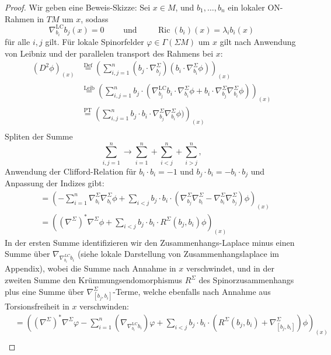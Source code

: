 \documentclass[10pt, letterpaper]{article}
\begin{document}
\begin{proof}
  Wir geben eine Beweis-Skizze: Sei $x \in M$, und $b_1, \ldots, b_n$ ein lokaler ON-Rahmen in $TM$ um $x$, sodass 
  $$\nabla_{b_i}^{\mathrm{LC}} b_j(x)=0\qquad \text{ und }\qquad \operatorname{Ric}\left(b_i\right)(x)=\lambda_i b_i(x)$$
  für alle $i, j$ gilt. Für lokale Spinorfelder $\varphi \in \Gamma(\Sigma M)$ um $x$ gilt nach Anwendung von Leibniz und der parallelen transport des Rahmens bei $x$:
  $$\begin{aligned}
    \left(D^2 \phi\right)_{(x)} 
    & \stackrel{\text{Def}}{=}\left(\sum_{i, j=1}^n \left(b_j \cdot \nabla_{b_j}^{\Sigma}\right)\left( b_i \cdot \nabla_{b_i}^{\Sigma} \phi \right)\right)_{(x)} \\ 
    & \stackrel{\text{Leib}}{=}\left(\sum_{i, j=1}^n b_j \cdot(\nabla_{b_j}^{\mathrm{LC}} b_i \cdot \nabla_{b_i}^{\Sigma} \phi+b_i \cdot \nabla_{b_j}^{\Sigma} \nabla_{b_i}^{\Sigma} \phi)\right)_{(x)} \\ 
    & \stackrel{\text{PT}}{=}\left(\sum_{i, j=1}^n b_j \cdot b_i \cdot \nabla_{b_j}^{\Sigma} \nabla_{b_i}^{\Sigma} \phi)\right)_{(x)} \\ 
  \end{aligned}$$
  Spliten der Summe
  $$\sum_{i,j=1}^n\to \sum_{i=1}^n + \sum_{i<j}^n + \sum_{i>j}^n,$$
  Anwendung der Clifford-Relation für $ b_i \cdot b_i=-1$ und $b_j\cdot b_i=-b_i\cdot b_j$ und Anpassung der Indizes gibt:
  $$\begin{aligned} 
    & = \left(-\sum_{i=1}^n \nabla_{b_i}^{\Sigma} \nabla_{b_i}^{\Sigma} \phi+\sum_{i<j} b_j \cdot b_i \cdot\left(\nabla_{b_j}^{\Sigma} \nabla_{b_i}^{\Sigma}-\nabla_{b_i}^{\Sigma} \nabla_{b_j}^{\Sigma}\right) \phi\right)_{(x)} \\ 
    & =\left(\left(\nabla^{\Sigma}\right)^* \nabla^{\Sigma} \phi+\sum_{i<j} b_j \cdot b_i \cdot R^{\Sigma}\left(b_j, b_i\right) \phi\right)_{(x)}
  \end{aligned}$$
  In der ersten Summe identifizieren wir den Zusammenhangs-Laplace minus einen Summe über $\nabla_{\nabla_{b_i}^{LC}b_i}$ (siehe lokale Darstellung von Zusammenhangslaplace im Appendix), wobei die Summe nach Annahme in $x$ verschwindet, und in der zweiten Summe den Krümmungsendomorphismus $R^\Sigma$ des Spinorzusammenhangs plus eine Summe über $\nabla^\Sigma_{[b_j,b_i]}$-Terme, welche ebenfalls nach Annahme aus Torsionsfreiheit in $x$ verschwinden:
  $$\begin{aligned} 
    & = \left(\left(\nabla^{\Sigma}\right)^* \nabla^{\Sigma}\varphi - \sum_{i=1}^n\left(\nabla_{\nabla_{b_i}^{\mathrm{LC}} b_i}\right)\varphi +\sum_{i<j} b_j \cdot b_i \cdot\left(R^{\Sigma}\left(b_j, b_i\right) + \nabla^\Sigma_{[b_j,b_i]}\right) \phi\right)_{(x)} \\ 

\end{aligned}$$
\end{proof}
\end{document}
